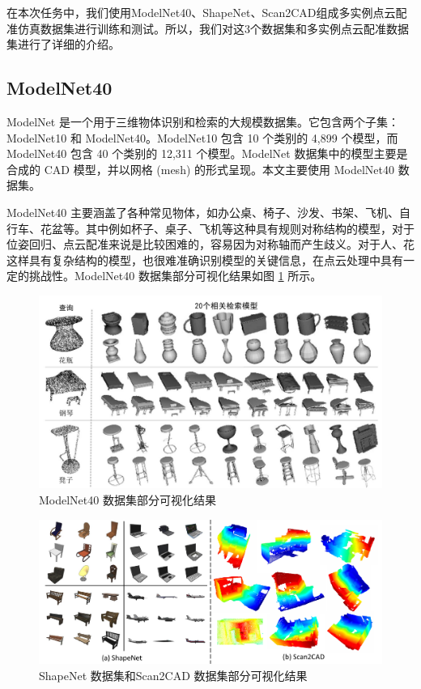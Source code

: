 在本次任务中，我们使用ModelNet40、ShapeNet、Scan2CAD组成多实例点云配准仿真数据集进行训练和测试。所以，我们对这3个数据集和多实例点云配准数据集进行了详细的介绍。

\label{sec:dataset}

\subsection{ModelNet40}
ModelNet 是一个用于三维物体识别和检索的大规模数据集。它包含两个子集：ModelNet10 和 ModelNet40。ModelNet10 包含 10 个类别的 4,899 个模型，而 ModelNet40 包含 40 个类别的 12,311 个模型。ModelNet 数据集中的模型主要是合成的 CAD 模型，并以网格 (mesh) 的形式呈现。本文主要使用 ModelNet40 数据集。 

ModelNet40 主要涵盖了各种常见物体，如办公桌、椅子、沙发、书架、飞机、自行车、花盆等。其中例如杯子、桌子、飞机等这种具有规则对称结构的模型，对于位姿回归、点云配准来说是比较困难的，容易因为对称轴而产生歧义。对于人、花这样具有复杂结构的模型，也很难准确识别模型的关键信息，在点云处理中具有一定的挑战性。ModelNet40 数据集部分可视化结果如图 \ref{fig:modelnet} 所示。

\begin{figure}
    \centering
    \includegraphics[width=\textwidth]{images/ModelNet.pdf}
    \caption{ModelNet40 数据集部分可视化结果}
    \label{fig:modelnet}
    \vspace{-0.5cm}
\end{figure}

\begin{figure}
    \centering
    \includegraphics[width=\textwidth]{images/Shapenet-Scan2CAD.pdf}
    \caption{ShapeNet 数据集和Scan2CAD 数据集部分可视化结果}
    \label{fig:ShapeNet&Scan2CAD}
    \vspace{-0.5cm}
\end{figure}
